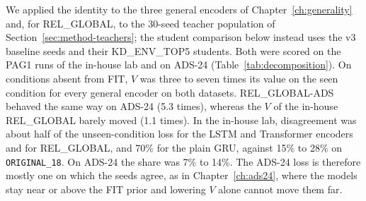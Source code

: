 We applied the identity to the three general encoders of
Chapter~\ref{ch:generality} and, for REL\_GLOBAL, to the 30-seed
teacher population of Section~\ref{sec:method-teachers}; the student
comparison below instead uses the v3 baseline seeds and their
KD\_ENV\_TOP5 students. Both were scored
on the PAG1 runs of the in-house lab and on ADS-24
(Table~\ref{tab:decomposition}). On conditions
absent from FIT, $V$ was three to seven times its value on the seen
condition for every general encoder on both datasets. REL\_GLOBAL-ADS
behaved the same way on ADS-24 (5.3 times), whereas the $V$ of the
in-house REL\_GLOBAL barely moved (1.1 times). In the in-house lab, disagreement was
about half of the unseen-condition loss for the LSTM and Transformer
encoders and for REL\_GLOBAL, and 70\% for the plain GRU, against 15\%
to 28\% on \texttt{ORIGINAL\_18}. On ADS-24 the share was 7\% to 14\%.
The ADS-24 loss is therefore mostly one on which the seeds agree,
as in Chapter~\ref{ch:ads24}, where the models stay near or
above the FIT prior and lowering $V$ alone cannot
move them far.

